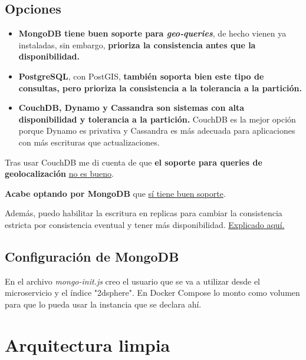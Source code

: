\subsection{Opciones}

\begin{itemize}
	\item \textbf{MongoDB tiene buen soporte para \textit{geo-queries}}, de hecho vienen ya instaladas, sin embargo, \textbf{prioriza la consistencia antes que la disponibilidad.}
\item \textbf{PostgreSQL}, con PostGIS, \textbf{también soporta bien este tipo de consultas, pero prioriza la consistencia a la tolerancia a la partición.} 
\item \textbf{CouchDB, Dynamo y Cassandra son sistemas con alta disponibilidad y tolerancia a la partición.} CouchDB es la mejor opción porque Dynamo es privativa y Cassandra es más adecuada para aplicaciones con más
escrituras que actualizaciones. 
\end{itemize}



Tras usar CouchDB me di cuenta de que \textbf{el soporte para queries de geolocalización} \href{https://docs.couchdb.org/en/stable/ddocs/search.html?highlight=geospatial#geographical-searches}{no es bueno}.

\textbf{Acabe optando por MongoDB} que \href{https://stackoverflow.com/questions/25734092/query-locations-within-a-radius-in-mongodb}{sí tiene buen soporte}.

Además, puedo habilitar la escritura en replicas para cambiar la consistencia estricta por consistencia eventual y tener más disponibilidad. \href{https://stackoverflow.com/questions/11292215/where-does-mongodb-stand-in-the-cap-theorem}{Explicado aquí.}

\subsection{Configuración de MongoDB}

En el archivo \textit{mongo-init.js} creo el usuario que se va a utilizar desde el microservicio y el índice "2dsphere". 
En Docker Compose lo monto como volumen para que lo pueda usar la instancia que se declara ahí.

\section{Arquitectura limpia}\label{sec:clean}

